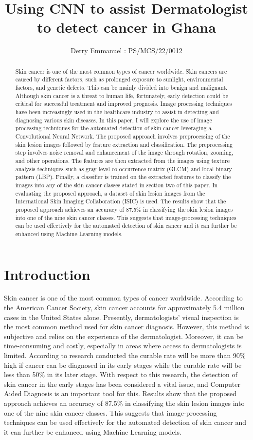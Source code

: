 \documentclass[twocolumn]{article}
\title{Using CNN to assist Dermatologist to detect cancer in Ghana}
\author{Derry Emmanuel : PS/MCS/22/0012}
\date{}
\begin{document}
\maketitle
\raggedbottom
\begin{abstract}
Skin cancer is one of the most common types of cancer worldwide.  Skin cancers are caused by different factors, such as prolonged exposure to sunlight, environmental factors, and genetic defects. This can be mainly divided into benign and malignant. Although skin cancer is a threat to human life, fortunately, early detection could be critical for successful treatment and improved prognosis. Image processing techniques have been increasingly used in the healthcare industry to assist in detecting and diagnosing various skin diseases. In this paper, I will explore the use of image processing techniques for the automated detection of skin cancer leveraging a Convolutional Neural Network. The proposed approach involves preprocessing of the skin lesion images followed by feature extraction and classification. The preprocessing step involves noise removal and enhancement of the image through rotation, zooming, and other operations.  The features are then extracted from the images using texture analysis techniques such as gray-level co-occurrence matrix (GLCM) and local binary pattern (LBP). Finally, a classifier is trained on the extracted features to classify the images into any of the skin cancer classes stated in section two of this paper. In evaluating the proposed approach, a dataset of skin lesion images from the International Skin Imaging Collaboration (ISIC) is used. The results show that the proposed approach achieves an accuracy of 87.5\% in classifying the skin lesion images into one of the nine skin cancer classes. This suggests that image-processing techniques can be used effectively for the automated detection of skin cancer and it can further be enhanced using Machine Learning models.
\end{abstract}
\section{Introduction}
Skin cancer is one of the most common types of cancer worldwide. According to the American Cancer Society, skin cancer accounts for approximately 5.4 million cases in the United States alone. Presently, dermatologists' visual inspection is the most common method used for skin cancer diagnosis. However, this method is subjective and relies on the experience of the dermatologist. Moreover, it can be time-consuming and costly, especially in areas where access to dermatologists is limited. According to research conducted the curable rate will be more than 90\% high if cancer can be diagnosed in its early stages while the curable rate will be less than 50\% in its later stage. With respect to this research, the detection of skin cancer in the early stages has been considered a vital issue, and Computer Aided Diagnosis is an important tool for this. Results show that the proposed approach achieves an accuracy of 87.5\% in classifying the skin lesion images into one of the nine skin cancer classes. This suggests that image-processing techniques can be used effectively for the automated detection of skin cancer and it can further be enhanced using Machine Learning models.
\end{document}
